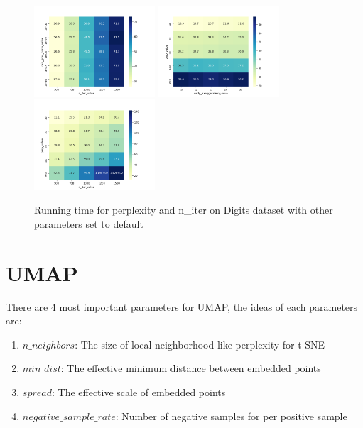 \begin{figure}[H]
\centering  %
{
\label{Fig.sub.1}
\includegraphics[width=4.5cm,height=4.5cm\textwidth]{images/t-sne/Digit_elapsed_time_min_grad_norm_value_n_iter_value_heatmap.png}}
{
\label{Fig.sub.2}
\includegraphics[width=4.5cm,height=4.5cm\textwidth]{images/t-sne/Digit_elapsed_time_perp_value_early_exaggeration_value_heatmap.png}}
{
\label{Fig.sub.3}
\includegraphics[width=4.5cm,height=4.5cm\textwidth]{images/t-sne/Digit_elapsed_time_perp_value_n_iter_value_heatmap.png}}
\centering
\caption{Running time for perplexity and n\_iter on Digits dataset with other parameters set to default }
\end{figure}

\section{UMAP}
There are 4 most important parameters for UMAP, the ideas of each parameters are:

\begin{enumerate}[1)]
\item $n\_neighbors$: The size of local neighborhood like perplexity for t-SNE
\item $min\_dist$: The effective minimum distance between embedded points
\item $spread$: The effective scale of embedded points
\item $negative\_sample\_rate$: Number of negative samples for per positive sample
\end{enumerate}\\

